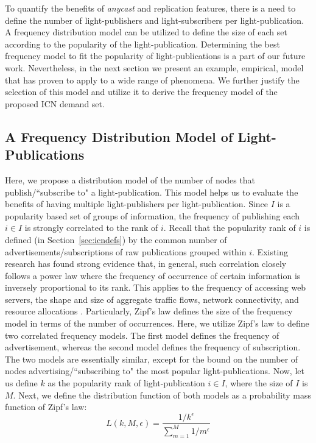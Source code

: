 \documentclass[journal]{IEEEtran}
\begin{document}
To quantify the benefits of \emph{anycast} and replication features, there is a need to define the number of light-publishers and light-subscribers per light-publication. A frequency distribution model can be utilized to define the size of each set according to the popularity of the light-publication. Determining the best frequency model to fit the popularity of light-publications is a part of our future work. Nevertheless, in the next section we present an example, empirical, model that has proven to apply to a wide range of phenomena. We further justify the selection of this model and utilize it to derive the frequency model of the proposed ICN demand set.

\subsection{A Frequency Distribution Model of Light-Publications}\label{sec:zipf}
Here, we propose a distribution model of the number of nodes that publish/``subscribe to" a light-publication. This model helps us to evaluate the benefits of having multiple light-publishers per light-publication. Since $I$ is a popularity based set of groups of information, the frequency of publishing each $i \in I$ is strongly correlated to the rank of $i$. Recall that the popularity rank of $i$ is defined (in Section~\ref{sec:icndefs}) by the common number of advertisements/subscriptions of raw publications grouped within $i$. Existing research has found strong evidence that, in general, such correlation closely follows a power law where the frequency of occurrence of certain information is inversely proportional to its rank. This applies to the frequency of accessing web servers, the shape and size of aggregate traffic flows, network connectivity, and resource allocations \cite{shi2:Zipf, cav:rwa, nai:rwa,car:ICnet, shi:Zipf, kot:Zipf,bre:Zipf}. 
Particularly, Zipf's law defines the size of the frequency model in terms of the number of occurrences. Here, we utilize Zipf's law to define two correlated frequency models. The first model defines the frequency of advertisement, whereas the second model defines the frequency of subscription. The two models are essentially similar, except for the bound on the number of nodes advertising/``subscribing to" the most popular light-publications.
Now, let us define $k$ as the popularity rank of light-publication $i \in I$, where the size of $I$ is $M$. Next, we define the distribution function of both models as a probability mass function of Zipf's law:
\begin{equation}
L(k,M,\epsilon) = \frac{1/k^\epsilon}{\sum_{m =1}^M 1/m^\epsilon} \label{zipf}
\end{equation}
\end{document}
